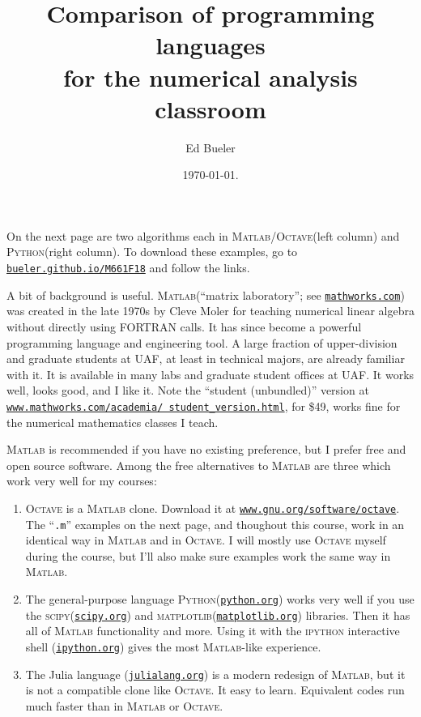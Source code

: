 \documentclass[11pt]{amsart}
\newcommand{\Matlab}{\textsc{Matlab}\xspace}
\newcommand{\Octave}{\textsc{Octave}\xspace}
\newcommand{\Python}{\textsc{Python}\xspace}
\newcommand{\scipy}{\textsc{scipy}\xspace}
\newcommand{\matplotlib}{\textsc{matplotlib}\xspace}
\begin{document}
\title{Comparison of programming languages \\ for the numerical analysis classroom}

\author{Ed Bueler}

\date{\today.}

\maketitle
\normalsize
\thispagestyle{empty}

\newcommand{\hrf}[2]{\href{#1}{\texttt{#2}}}

On the next page are two algorithms each in \Matlab/\Octave (left column) and \Python (right column).  To download these examples, go to \hrf{http://bueler.github.io/M661F18}{bueler.github.io/M661F18} and follow the links.

A bit of background is useful.  \Matlab (``matrix laboratory''; see \hrf{http://www.mathworks.com/}{mathworks.com}) was created in the late 1970s by Cleve Moler for teaching numerical linear algebra without directly using FORTRAN calls.  It has since become a powerful programming language and engineering tool.  A large fraction of upper-division and graduate students at UAF, at least in technical majors, are already familiar with it.  It is available in many labs and graduate student offices at UAF.  It works well, looks good, and I like it.  Note the ``student (unbundled)'' version at \hrf{https://www.mathworks.com/academia/student_version.html}{\texttt{www.mathworks.com/academia/ student\_version.html}}, for \$49, works fine for the numerical mathematics classes I teach.

\Matlab is recommended if you have no existing preference, but I prefer free and open source software.  Among the free alternatives to \Matlab are three which work very well for my courses:
\renewcommand{\labelenumi}{\arabic{enumi}.}
\begin{enumerate}
\item \Octave is a \Matlab clone.  Download it at
\hrf{http://www.gnu.org/software/octave/}{www.gnu.org/software/octave}.  The ``\texttt{.m}'' examples on the next page, and thoughout this course, work in an identical way in \Matlab and in \Octave.  I will mostly use \Octave myself during the course, but I'll also make sure examples work the same way in \Matlab.
\item The general-purpose language \Python (\hrf{http://python.org/}{python.org}) works very well if you use the \scipy (\hrf{http://www.scipy.org/}{scipy.org}) and \matplotlib (\hrf{http://matplotlib.org/}{matplotlib.org}) libraries.  Then it has all of \Matlab functionality and more.  Using it with the \textsc{ipython} interactive shell (\hrf{http://ipython.org/}{ipython.org}) gives the most \Matlab-like experience.
\item The Julia language (\hrf{https://julialang.org/}{julialang.org}) is a modern redesign of \Matlab, but it is not a compatible clone like \Octave.  It easy to learn.  Equivalent codes run much faster than in \Matlab or \Octave.
\end{enumerate}
\end{document}
